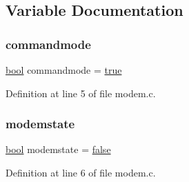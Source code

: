 \subsection{Variable Documentation}
\mbox{\label{a00038_aaf612f2f6c2c9931ab63296b3514a037_aaf612f2f6c2c9931ab63296b3514a037}} 
\subsubsection{\texorpdfstring{commandmode}{commandmode}}
{\footnotesize\ttfamily \hyperlink{a00134_af6a258d8f3ee5206d682d799316314b1_af6a258d8f3ee5206d682d799316314b1}{bool} commandmode = \hyperlink{a00134_af6a258d8f3ee5206d682d799316314b1_af6a258d8f3ee5206d682d799316314b1a08f175a5505a10b9ed657defeb050e4b}{true}}



Definition at line 5 of file modem.\+c.

\mbox{\label{a00038_a0105e5654e7f0fa503f2853c88a2f782_a0105e5654e7f0fa503f2853c88a2f782}} 
\subsubsection{\texorpdfstring{modemstate}{modemstate}}
{\footnotesize\ttfamily \hyperlink{a00134_af6a258d8f3ee5206d682d799316314b1_af6a258d8f3ee5206d682d799316314b1}{bool} modemstate = \hyperlink{a00134_af6a258d8f3ee5206d682d799316314b1_af6a258d8f3ee5206d682d799316314b1ae9de385ef6fe9bf3360d1038396b884c}{false}}



Definition at line 6 of file modem.\+c.

